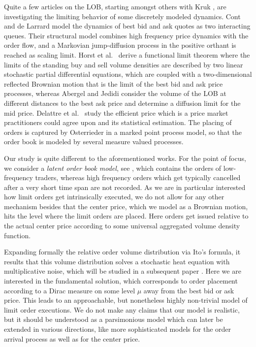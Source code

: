 \documentclass[11pt]{scrartcl}
\begin{document}
Quite a few articles on the LOB, starting amongst others with Kruk \cite{K},
are investigating the limiting behavior of some discretely modeled dynamics.
Cont and de Larrard \cite{CL} model the dynamics of best bid and ask quotes as
two interacting queues. Their structural model combines high frequency price
dynamics with the order flow, and a Markovian jump-diffusion process in the
positive orthant is reached as scaling limit. Horst et al.\ \cite{BHQ} derive
a functional limit theorem where the limits of the standing buy and sell
volume densities are described by two linear stochastic partial differential
equations, which are coupled with a two-dimensional reflected Brownian motion
that is the limit of the best bid and ask price processes, whereas Abergel and
Jedidi \cite{AJ} consider the volume of the LOB at different distances to the
best ask price and determine a diffusion limit for the mid price. Delattre et
al.\ \cite{dLRR} study the efficient price which is a price market
practitioners could agree upon and its statistical estimation. The placing of
orders is captured by Osterrieder \cite{O} in a marked point process model, so
that the order book is modeled by several measure valued processes.

Our study is quite different to the aforementioned works. For the point of
focus, we consider a \emph{latent order book model}, see \cite{TothEtAl2011},
which contains the orders of low-frequency traders, whereas high
frequency orders which get typically cancelled after a very short time span
are not recorded. As we are in particular interested how limit orders get
intrinsically executed, we do not allow for any other mechanism besides that
the center price, which we model as a Brownian motion, hits the level where the
limit orders are placed. Here orders get issued relative to the actual center
price according to some universal aggregated volume density function.

Expanding formally the relative order volume distribution via Ito's formula,
it results that this volume distribution solves a stochastic heat equation
with multiplicative noise, which will be studied in a subsequent paper
\cite{HKR-SPDE}. Here we are interested in
the fundamental solution, which corresponds to order placement according to a
Dirac measure on some level $\mu$ away from the best bid or ask price. This
leads to an approachable, but nonetheless highly non-trivial model of limit
order executions. We do not make any claims that our model is realistic, but
it should be understood as a parsimonious model which can later be extended in
various directions, like more sophisticated models for the order arrival
process as well as for the center price.
\end{document}
